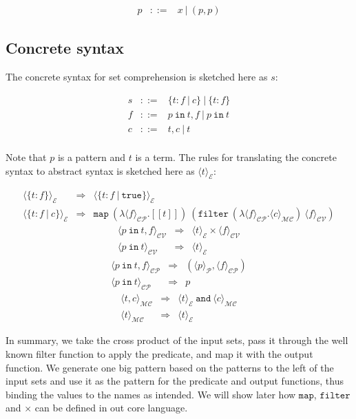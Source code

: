 \documentclass[a4paper]{article}
\newcommand{\pipe}{\ | \ }
\newcommand{\s}[1]{\mathtt{#1}}
\newcommand{\sugar}[2]{\langle#2\rangle_{\mathcal{#1}}}
\newcommand{\sug}[1]{\sugar{E}{#1}}
\begin{document}
\begin{eqnarray*}
p & ::= &  x \pipe (p, p)
\end{eqnarray*}


\subsection{Concrete syntax}
\label{sec:concreteSyntax}


The concrete syntax for set comprehension is sketched here as $s$:

\begin{eqnarray*}
s & ::= & \{ t : f \pipe c\} \pipe \{ t : f \}\\
f & ::= & p \s{\ in\ } t, f \pipe p \s{\ in\ } t\\
c & ::= & t, c \pipe t \\
\end{eqnarray*}

Note that $p$ is a pattern and $t$ is a term. The rules for translating
the concrete syntax to abstract syntax is sketched here as
$\sug{t}$:

\begin{eqnarray*}
\sug{\{t:f\}} & \Longrightarrow & \sug{\{t:f\ |\ \s{true}\}} \\
\sug{\{t:f\ |\ c\}} & \Longrightarrow &
\s{map\ }
(\lambda \sugar{CP}{f}. [\![ t ]\!])\
(\s{filter\ } (\lambda \sugar{CP}{f}. \sugar{MC}{c})\
\sugar{CV}{f})
\end{eqnarray*}
\begin{eqnarray*}
\sugar{CV}{p\s{\ in\ } t, f} & \Longrightarrow & \sug{t} \times \sugar{CV}{f} \\
\sugar{CV}{p\s{\ in\ } t} & \Longrightarrow & \sug{t}
\end{eqnarray*}
\begin{eqnarray*}
\sugar{CP}{p\s{\ in\ } t, f} & \Longrightarrow & (\sugar{P}{p}, \sugar{CP}{f}) \\
\sugar{CP}{p\s{\ in\ } t} & \Longrightarrow & p
\end{eqnarray*}
\begin{eqnarray*}
\sugar{MC}{t, c} & \Longrightarrow & \sug{t} \s{\ and\ } \sugar{MC}{c} \\
\sugar{MC}{t} & \Longrightarrow & \sug{t}
\end{eqnarray*}


In summary, we take the cross product of the input sets, pass it
through the well known filter function to apply the predicate,
and map it with the output function. We generate one big pattern
based on the patterns to the left of the input sets and use it as
the pattern for the predicate and output functions, thus binding
the values to the names as intended. We will show later how $\s{map}$, $\s{filter}$ and $\s{\times}$ can be defined in out core language.
\end{document}
